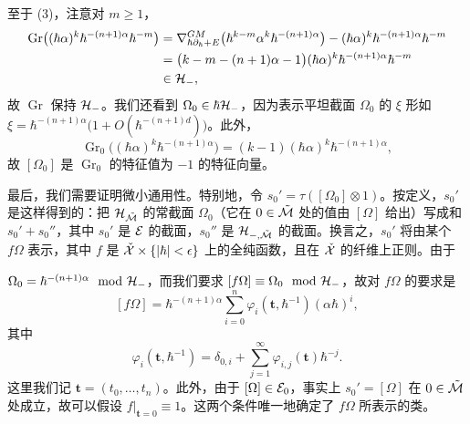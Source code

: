 至于 (3)，注意对 $m\ge1$，
\begin{align*}
  \operatorname{Gr}\bigl((\hbar\alpha)^{k}\hbar^{-(n+1)\alpha}\hbar^{-m}\bigr)
  &=\nabla^{GM}_{\hbar\partial_\hbar+E}\bigl(\hbar^{k-m}\alpha^{k}\hbar^{-(n+1)\alpha}\bigr)
  -(\hbar\alpha)^{k}\hbar^{-(n+1)\alpha}\hbar^{-m}\\
  &=\bigl(k-m-(n+1)\alpha-1\bigr)(\hbar\alpha)^{k}\hbar^{-(n+1)\alpha}\hbar^{-m}\\
  &\in\mathcal{H}_-,
\end{align*}
故 $\operatorname{Gr}$ 保持 $\mathcal{H}_-$。我们还看到 $\Omega_0\in\hbar\mathcal{H}_-$，因为表示平坦截面 $\Omega_0$ 的 $\xi$ 形如 $\xi=\hbar^{-(n+1)\alpha}\bigl(1+O(\hbar^{-(n+1)d})\bigr)$。此外，
\begin{equation}
  \operatorname{Gr}_0\bigl((\hbar\alpha)^{k}\hbar^{-(n+1)\alpha}\bigr)
  =(k-1)(\hbar\alpha)^{k}\hbar^{-(n+1)\alpha}, \tag{2.41}
\end{equation}
故 $[\Omega_0]$ 是 $\operatorname{Gr}_0$ 的特征值为 $-1$ 的特征向量。


最后，我们需要证明微小通用性。特别地，令 $s_0'=\tau([\Omega_0]\otimes1)$。按定义，$s_0'$ 是这样得到的：把 $\mathcal{H}_{\tilde{\mathcal{M}}}$ 的常截面 $\Omega_0$（它在 $0\in\tilde{\mathcal{M}}$ 处的值由 $[\Omega]$ 给出）写成和 $s_0'+s_0''$，其中 $s_0'$ 是 $\mathcal{E}$ 的截面，$s_0''$ 是 $\mathcal{H}_{-,\tilde{\mathcal{M}}}$ 的截面。换言之，$s_0'$ 将由某个 $f\Omega$ 表示，其中 $f$ 是 $\check{\mathcal{X}}\times\{|\hbar|<\epsilon\}$ 上的全纯函数，且在 $\check{\mathcal{X}}$ 的纤维上正则。由于

$\Omega_0=\hbar^{-(n+1)\alpha}\mod{\mathcal{H}}_-$，而我们要求 $[f\Omega]\equiv\Omega_0\mod{\mathcal{H}}_-$，故对 $f\Omega$ 的要求是
\[
  [f\Omega]=\hbar^{-(n+1)\alpha}\sum_{i=0}^{n}\varphi_i(\mathbf{t},\hbar^{-1})(\alpha\hbar)^{i},
\]
其中
\[
  \varphi_i(\mathbf{t},\hbar^{-1})=\delta_{0,i}
  +\sum_{j=1}^{\infty}\varphi_{i,j}(\mathbf{t})\hbar^{-j}.
\]
这里我们记 $\mathbf{t}=(t_0,\ldots,t_n)$。此外，由于 $[\Omega]\in\mathcal{E}_0$，事实上 $s_0'=[\Omega]$ 在 $0\in\tilde{\mathcal{M}}$ 处成立，故可以假设 $f|_{\mathbf{t}=0}\equiv1$。这两个条件唯一地确定了 $f\Omega$ 所表示的类。

